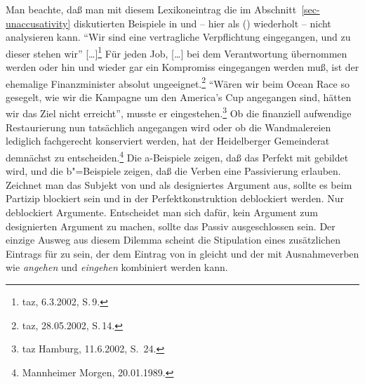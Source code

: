 Man beachte, daß man mit diesem Lexikoneintrag die im Abschnitt~\ref{sec-unaccusativity} 
diskutierten Beispiele in  und  --
hier als () wiederholt -- nicht analysieren kann. 
\eal
\label{bsp-eingegangen-all-zwei}
\ex{}
"`Wir sind eine vertragliche Verpflichtung eingegangen, und zu dieser stehen wir"' [\ldots]\footnote{
        taz, 6.3.2002, S.\,9.%
}
\ex\label{bsp-eingegangen-zwei}
Für jeden Job, [\ldots] bei dem Verantwortung übernommen werden oder hin und wieder gar
    ein Kompromiss eingegangen werden muß, ist der ehemalige Finanzminister absolut ungeeignet.\footnote{
        taz, 28.05.2002, S.\,14.%
    }
%
\zl
\eal
\label{bsp-angegangen-all-zwei}
\ex{}
"`Wären wir beim Ocean Race so gesegelt, wie wir die Kampagne um den America's Cup angegangen sind, 
hätten wir das Ziel nicht erreicht"', musste er eingestehen.\footnote{
        taz Hamburg, 11.6.2002, S.\, 24.%
}
%
\ex\label{bsp-angegangen-zwei}
Ob die finanziell
aufwendige Restaurierung nun tatsächlich angegangen wird oder ob die Wandmalereien lediglich fachgerecht konserviert werden, hat der
Heidelberger Gemeinderat demnächst zu entscheiden.\footnote{
        Mannheimer Morgen, 20.01.1989.%
}
\zl
Die a-Beispiele zeigen, daß das Perfekt mit \sein gebildet wird, und die b"=Beispiele zeigen, daß
die Verben eine Passivierung erlauben.
Zeichnet man das Subjekt von  und  
als designiertes Argument aus, sollte es beim Partizip blockiert sein und in der
Perfektkonstruktion deblockiert werden. Nur \haben deblockiert Argumente.
Entscheidet man sich dafür, kein Argument zum designierten Argument zu machen,
sollte das Passiv ausgeschlossen sein. Der einzige Ausweg aus diesem Dilemma
scheint die Stipulation eines zusätzlichen Eintrags für \sein zu sein,
der dem Eintrag von \haben in  gleicht und der 
mit Ausnahmeverben wie \emph{angehen} und \emph{eingehen} kombiniert werden kann.


